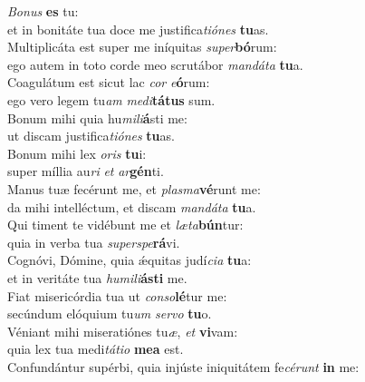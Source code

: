 \evenverse \textit{Bo}\textit{nus} \textbf{es} tu:~\*\\
\evenverse et in bonitáte tua doce me justifica\textit{ti}\textit{ó}\textit{nes} \textbf{tu}as.\\
\oddverse Multiplicáta est super me iníquitas \textit{su}\textit{per}\textbf{bó}rum:~\*\\
\oddverse ego autem in toto corde meo scrutábor \textit{man}\textit{dá}\textit{ta} \textbf{tu}a.\\
\evenverse Coagulátum est sicut lac \textit{cor} \textit{e}\textbf{ó}rum:~\*\\
\evenverse ego vero legem tu\textit{am} \textit{me}\textit{di}\textbf{tá}\textbf{tus} sum.\\
\oddverse Bonum mihi quia hu\textit{mi}\textit{li}\textbf{á}sti me:~\*\\
\oddverse ut discam justifica\textit{ti}\textit{ó}\textit{nes} \textbf{tu}as.\\
\evenverse Bonum mihi lex \textit{o}\textit{ris} \textbf{tu}i:~\*\\
\evenverse super míllia au\textit{ri} \textit{et} \textit{ar}\textbf{gén}ti.\\
\oddverse Manus tuæ fecérunt me, et \textit{plas}\textit{ma}\textbf{vé}runt me:~\*\\
\oddverse da mihi intelléctum, et discam \textit{man}\textit{dá}\textit{ta} \textbf{tu}a.\\
\evenverse Qui timent te vidébunt me et \textit{læ}\textit{ta}\textbf{bún}tur:~\*\\
\evenverse quia in verba tua \textit{su}\textit{per}\textit{spe}\textbf{rá}vi.\\
\oddverse Cognóvi, Dómine, quia ǽquitas judí\textit{ci}\textit{a} \textbf{tu}a:~\*\\
\oddverse et in veritáte tua \textit{hu}\textit{mi}\textit{li}\textbf{á}\textbf{sti} me.\\
\evenverse Fiat misericórdia tua ut \textit{con}\textit{so}\textbf{lé}tur me:~\*\\
\evenverse secúndum elóquium tu\textit{um} \textit{ser}\textit{vo} \textbf{tu}o.\\
\oddverse Véniant mihi miseratiónes tu\textit{æ}, \textit{et} \textbf{vi}vam:~\*\\
\oddverse quia lex tua medi\textit{tá}\textit{ti}\textit{o} \textbf{me}\textbf{a} est.\\
\evenverse Confundántur supérbi, quia injúste iniquitátem fe\textit{cé}\textit{runt} \textbf{in} me:~\*\\
